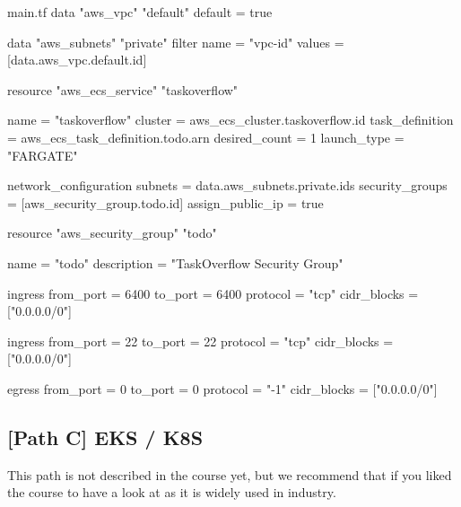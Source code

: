 \documentclass{csse4400}
\begin{document}
\begin{code}[language=terraform,numbers=none]{main.tf}
data "aws_vpc" "default" {
    default = true
}

data "aws_subnets" "private" {
  filter {
    name   = "vpc-id"
    values = [data.aws_vpc.default.id]
  }
}

resource "aws_ecs_service" "taskoverflow" {
  name            = "taskoverflow"
  cluster         = aws_ecs_cluster.taskoverflow.id
  task_definition = aws_ecs_task_definition.todo.arn
  desired_count   = 1
  launch_type     = "FARGATE"

  network_configuration {
    subnets             = data.aws_subnets.private.ids
    security_groups     = [aws_security_group.todo.id]
    assign_public_ip    = true
  }
}

resource "aws_security_group" "todo" {
  name = "todo"
  description = "TaskOverflow Security Group"

  ingress {
    from_port = 6400
    to_port = 6400
    protocol = "tcp"
    cidr_blocks = ["0.0.0.0/0"]
  }

  ingress {
    from_port = 22
    to_port = 22
    protocol = "tcp"
    cidr_blocks = ["0.0.0.0/0"]
  }

  egress {
    from_port = 0
    to_port = 0
    protocol = "-1"
    cidr_blocks = ["0.0.0.0/0"]
  }
}
\end{code}

\subsection{[Path C] EKS / K8S}

This path is not described in the course yet, but we recommend that if you liked the course to have a look at  as it is widely used in industry.



\end{document}
